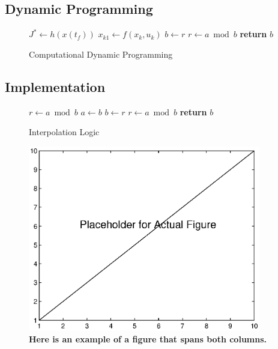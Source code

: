 \documentclass[twocolumn,letterpaper]{IEEEAerospaceCLS}  %
\begin{document}
\subsection{Dynamic Programming}
\begin{figure}[!htb]
	\begin{algorithmic}[1]
		\State $J^*\gets h(x(t_f))$ 
					\State $x_{k1}\gets f(x_k, u_k)$
		\State $b\gets r$
		\State $r\gets a\bmod b$
		\EndFor\label{euclidendwhile}
		\EndFor
		\EndFor
		\State \textbf{return} $b$
		\EndProcedure
	\end{algorithmic}
	\caption{Computational Dynamic Programming}\label{euclid}
\end{figure}

\subsection{Implementation}

\begin{figure}[!htb]
	\begin{algorithmic}[1]
		\State $r\gets a\bmod b$
		\State $a\gets b$
		\State $b\gets r$
		\State $r\gets a\bmod b$
		\EndWhile\label{euclidendwhile}
		\State \textbf{return} $b$
		\EndProcedure
	\end{algorithmic}
	\caption{Interpolation Logic}\label{euclid}
\end{figure}

\begin{figure}
\centering
\includegraphics[width=4in]{Placeholder.eps}
\caption{\bf{Here is an example of a figure that spans both columns.}}
\label{FlowChart}
\end{figure}
\end{document}

